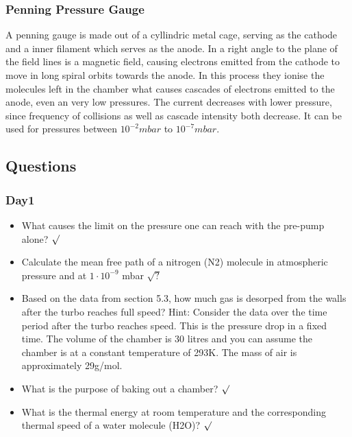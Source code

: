 \documentclass[]{article}
\begin{document}
\subsubsection[Penning]{Penning Pressure Gauge}
A penning gauge is made out of a cyllindric metal cage, serving as the cathode and a inner filament which serves as the anode. In a right angle to the plane of the field lines is a magnetic field, causing electrons emitted from the cathode to move in long spiral orbits towards the anode. In this process they ionise the molecules left in the chamber what causes cascades of electrons emitted to the anode, even an very low pressures. The current decreases with lower pressure, since frequency of collisions as well as cascade intensity both decrease. It can be used for pressures between $10^{-2}mbar$ to $10^{-7}mbar$.


\subsection{Questions}
\subsubsection{Day1}
\begin{itemize}  
	\item What causes the limit on the pressure one can reach with the pre-pump alone? $\surd$
	\item  Calculate the mean free path of a nitrogen (N2) molecule in atmospheric pressure and at $1 \cdot 10^{−9}$ mbar $\surd ?$
	\item Based on the data from section 5.3, how much gas is desorped from the walls after the turbo reaches full speed? Hint: Consider the data over the time period after the turbo reaches speed. This is the pressure drop in a ﬁxed time. The volume of the chamber is 30 litres and you can assume the chamber is at a constant temperature of 293K. The mass of air is approximately 29g/mol.
	 

	\item What is the purpose of baking out a chamber? $\surd$
	\item What is the thermal energy at room temperature and the corresponding thermal speed of a water molecule (H2O)? $\surd$
\end{itemize}
\end{document}
